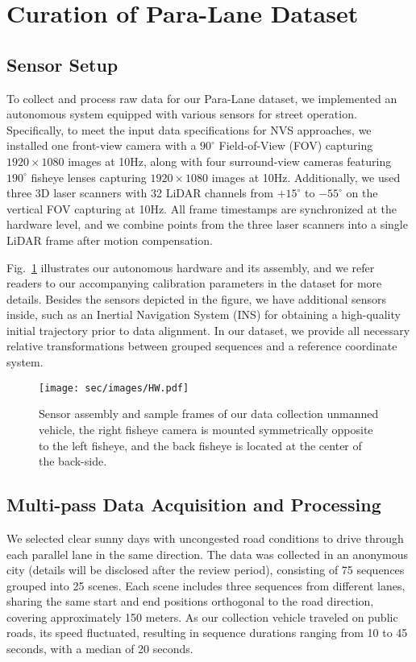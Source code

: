 \section{Curation of Para-Lane Dataset}
\label{sec:dataset}

\subsection{Sensor Setup}

To collect and process raw data for our Para-Lane dataset, we implemented an autonomous system equipped with various sensors for street operation. Specifically, to meet the input data specifications for NVS approaches, we installed one front-view camera with a $90^\circ$ Field-of-View (FOV) capturing $1920 \times 1080$ images at 10Hz, along with four surround-view cameras featuring $190^\circ$ fisheye lenses capturing $1920 \times 1080$ images at 10Hz. Additionally, we used three 3D laser scanners with 32 LiDAR channels from $+15^\circ$ to $-55^\circ$ on the vertical FOV capturing at 10Hz. All frame timestamps are synchronized at the hardware level, and we combine points from the three laser scanners into a single LiDAR frame after motion compensation.

Fig.~\ref{fig:assemble} illustrates our autonomous hardware and its assembly, and we refer readers to our {accompanying} calibration parameters {in the dataset} for more details. Besides the sensors depicted in the figure, we have additional sensors inside, such as an Inertial Navigation System (INS) for obtaining a high-quality initial trajectory prior to data alignment. In our dataset, we provide all necessary relative transformations between {grouped} sequences and a reference coordinate system.


\begin{figure}[t]
\texttt{[image: sec/images/HW.pdf]}
\caption{Sensor assembly and sample frames of our data collection unmanned vehicle, the right fisheye camera is mounted symmetrically opposite to the left fisheye, and the back fisheye is located at the center of the back-side.}
\label{fig:assemble}
\end{figure}

\subsection{Multi-pass Data Acquisition and Processing}

We selected clear sunny days with uncongested road conditions to drive through each parallel lane in the same direction. The data was collected in an anonymous city (details will be disclosed after the review period), consisting of 75 sequences grouped into 25 scenes. Each scene includes three sequences from different lanes, sharing the same start and end positions orthogonal to the road direction, covering approximately 150 meters. As our collection vehicle traveled on public roads, its speed fluctuated, resulting in sequence durations ranging from 10 to 45 seconds, with a median of 20 seconds.


